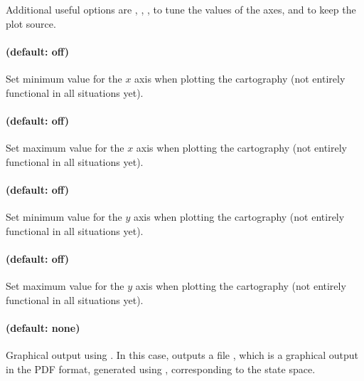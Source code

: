 Additional useful options are
,
,
,
to tune the values of the axes,
and  to keep the plot source.


\paragraph{ (default: off)}
Set minimum value for the $x$ axis when plotting the cartography (not entirely functional in all situations yet).

\paragraph{ (default: off)}
Set maximum value for the $x$ axis when plotting the cartography (not entirely functional in all situations yet).

\paragraph{ (default: off)}
Set minimum value for the $y$ axis when plotting the cartography (not entirely functional in all situations yet).

\paragraph{ (default: off)}
Set maximum value for the $y$ axis when plotting the cartography (not entirely functional in all situations yet).



\paragraph{ (default: none)}
Graphical output using \gdot{}.
In this case, \imitator{} outputs a file , which is a graphical output in the PDF format, generated using \gdot{}, corresponding to the state space.

